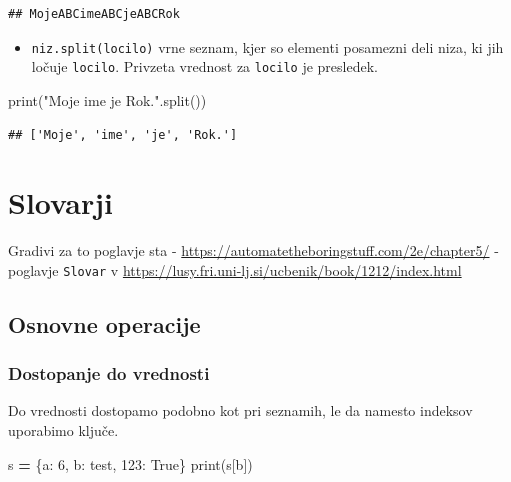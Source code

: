 \documentclass[
]{book}
\newenvironment{Shaded}{\begin{snugshade}}{\end{snugshade}}
\newcommand{\BuiltInTok}[1]{#1}
\newcommand{\DecValTok}[1]{\textcolor[rgb]{0.00,0.00,0.81}{#1}}
\newcommand{\NormalTok}[1]{#1}
\newcommand{\OperatorTok}[1]{\textcolor[rgb]{0.81,0.36,0.00}{\textbf{#1}}}
\newcommand{\StringTok}[1]{\textcolor[rgb]{0.31,0.60,0.02}{#1}}
\newcommand{\VariableTok}[1]{\textcolor[rgb]{0.00,0.00,0.00}{#1}}
\providecommand{\tightlist}{%
  \setlength{\itemsep}{0pt}\setlength{\parskip}{0pt}}
\begin{document}
\begin{verbatim}
## MojeABCimeABCjeABCRok
\end{verbatim}

\begin{itemize}
\tightlist
\item
  \texttt{niz.split(locilo)} vrne seznam, kjer so elementi posamezni deli niza, ki jih
  ločuje \texttt{locilo}. Privzeta vrednost za \texttt{locilo} je presledek.
\end{itemize}

\begin{Shaded}
\begin{Highlighting}[]
\BuiltInTok{print}\NormalTok{(}\StringTok{"Moje ime je Rok."}\NormalTok{.split())}
\end{Highlighting}
\end{Shaded}

\begin{verbatim}
## ['Moje', 'ime', 'je', 'Rok.']
\end{verbatim}

\hypertarget{slovarji}{%
\chapter{Slovarji}\label{slovarji}}

Gradivi za to poglavje sta
- \url{https://automatetheboringstuff.com/2e/chapter5/}
- poglavje \texttt{Slovar} v \url{https://lusy.fri.uni-lj.si/ucbenik/book/1212/index.html}

\hypertarget{osnovne-operacije}{%
\section{Osnovne operacije}\label{osnovne-operacije}}

\hypertarget{dostopanje-do-vrednosti}{%
\subsection{Dostopanje do vrednosti}\label{dostopanje-do-vrednosti}}

Do vrednosti dostopamo podobno kot pri seznamih, le da namesto indeksov uporabimo ključe.

\begin{Shaded}
\begin{Highlighting}[]
\NormalTok{s }\OperatorTok{=}\NormalTok{ \{}\StringTok{\textquotesingle{}a\textquotesingle{}}\NormalTok{: }\DecValTok{6}\NormalTok{, }\StringTok{\textquotesingle{}b\textquotesingle{}}\NormalTok{: }\StringTok{\textquotesingle{}test\textquotesingle{}}\NormalTok{, }\DecValTok{123}\NormalTok{: }\VariableTok{True}\NormalTok{\}}
\BuiltInTok{print}\NormalTok{(s[}\StringTok{\textquotesingle{}b\textquotesingle{}}\NormalTok{])}
\end{Highlighting}
\end{Shaded}
\end{document}
